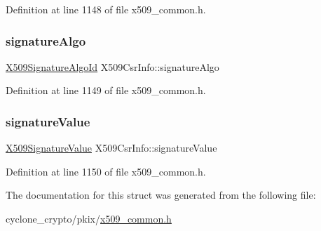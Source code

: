 Definition at line 1148 of file x509\+\_\+common.\+h.

\mbox{\label{structX509CsrInfo_aa0f75c78d019367fab5baeb5475ac5a1}} 
\subsubsection{\texorpdfstring{signature\+Algo}{signatureAlgo}}
{\footnotesize\ttfamily \hyperlink{structX509SignatureAlgoId}{X509\+Signature\+Algo\+Id} X509\+Csr\+Info\+::signature\+Algo}



Definition at line 1149 of file x509\+\_\+common.\+h.

\mbox{\label{structX509CsrInfo_a843a90077fa750f9eaf4027436f39d9c}} 
\subsubsection{\texorpdfstring{signature\+Value}{signatureValue}}
{\footnotesize\ttfamily \hyperlink{structX509SignatureValue}{X509\+Signature\+Value} X509\+Csr\+Info\+::signature\+Value}



Definition at line 1150 of file x509\+\_\+common.\+h.



The documentation for this struct was generated from the following file\+:\begin{DoxyCompactItemize}
\item 
cyclone\+\_\+crypto/pkix/\hyperlink{pkix_2x509__common_8h}{x509\+\_\+common.\+h}\end{DoxyCompactItemize}
